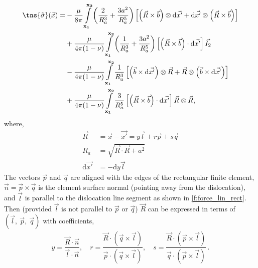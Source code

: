 \documentclass[11pt]{iopart}
\begin{document}
\begin{align}
    \label{eq:stress}
    \tns{\tilde{\sigma}}(\vec{x}) = &
    - \dfrac{\mu}{8\pi} \int\limits_{\mathbf{x_1}}^{\mathbf{x_2}} \left( \dfrac{2}{R_{a}^{3}} + \dfrac{3a^2}{R_{a}^{5}} \right) \left[ \left(\vec{R} \times \vec{b}\right) \otimes \mathrm{d}\vec{x'} + \mathrm{d}\vec{x'} \otimes \left(\vec{R} \times \vec{b}\right) \right]          \\
                                    & + \dfrac{\mu}{4\pi(1-\nu)} \int\limits_{\mathbf{x_1}}^{\mathbf{x_2}} \left( \dfrac{1}{R_{a}^{3}} + \dfrac{3a^2}{R_{a}^{5}} \right) \left[ \left(\vec{R} \times \vec{b}\right) \cdot \mathrm{d}\vec{x'} \right]\vec{I_2}\nonumber                  \\
                                    & -\dfrac{\mu}{4\pi(1-\nu)} \int\limits_{\mathbf{x_1}}^{\mathbf{x_2}}  \dfrac{1}{R_{a}^{3}} \left[ \left(\vec{b} \times \mathrm{d}\vec{x'}\right) \otimes \vec{R} + \vec{R} \otimes \left(\vec{b} \times \mathrm{d}\vec{x'}\right) \right]\nonumber \\
                                    & + \dfrac{\mu}{4\pi(1-\nu)} \int\limits_{\mathbf{x_1}}^{\mathbf{x_2}} \dfrac{3}{R_{a}^{5}} \left[ \left(\vec{R} \times \vec{b}\right) \cdot \mathrm{d}\vec{x'} \right]\vec{R}\otimes\vec{R}\nonumber,
\end{align}
where,
\begin{align}
    \vec{R}            & = \vec{x} - \vec{x'} = y \vec{l} + r \vec{p} + s \vec{q} \\
    R_a                & = \sqrt{\vec{R} \cdot \vec{R} + a^2}                     \\
    \mathrm{d}\vec{x'} & = -\mathrm{d} y \vec{l}
\end{align}
The vectors $\vec{p}$ and $\vec{q}$ are aligned with the edges of the rectangular finite element, $\vec{n} = \vec{p} \times \vec{q}$ is the element surface normal (pointing away from the dislocation), and $\vec{l}$ is parallel to the dislocation line segment as shown in \cref{f:force_lin_rect}. Then (provided $\vec{l}$ is not parallel to $\vec{p}$ or $\vec{q}$) $\vec{R}$ can be expressed in terms of $(\vec{l},~\vec{p},~\vec{q})$ with coefficients,
\begin{align}
    y = \dfrac{\vec{R}\cdot \vec{n}}{\vec{l}\cdot \vec{n}} \label{eq:problem},\quad
    r = \dfrac{\vec{R}\cdot (\vec{q} \times \vec{l})}{\vec{p}\cdot (\vec{q} \times \vec{l})}, \quad
    s = \dfrac{\vec{R}\cdot (\vec{p} \times \vec{l})}{\vec{q}\cdot (\vec{p} \times \vec{l})}\,.
\end{align}
\end{document}
